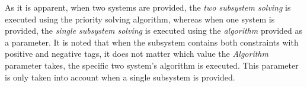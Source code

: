 \documentclass[12pt,twoside,a4paper]{book}
\begin{document}
    As it is apparent, when two systems are provided, the \emph{two subsystem solving} is executed using the priority solving algorithm, whereas when one system is provided, the \emph{single subsystem solving} is executed using the \emph{algorithm} provided as a parameter. It is noted that when the subsystem contains both constraints with positive and negative tags, it does not matter which value the \emph{Algorithm} parameter takes, the specific two system's algorithm is executed. This parameter is only taken into account when a single subsystem is provided.





\end{document}
